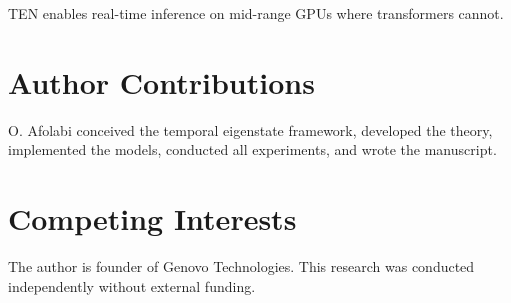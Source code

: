 \documentclass[11pt,letterpaper]{article}
\begin{document}
TEN enables real-time inference on mid-range GPUs where transformers cannot.

\section*{Author Contributions}

O. Afolabi conceived the temporal eigenstate framework, developed the theory, implemented the models, conducted all experiments, and wrote the manuscript.

\section*{Competing Interests}

The author is founder of Genovo Technologies. This research was conducted independently without external funding.
\end{document}
